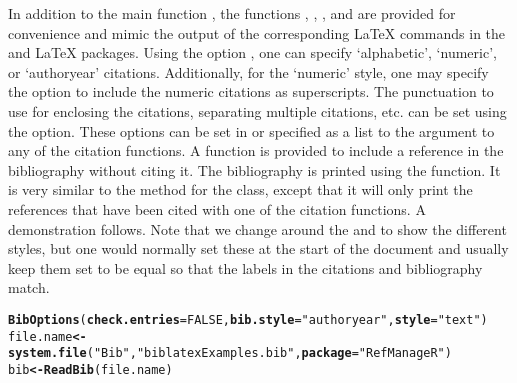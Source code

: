 \documentclass[article]{jss}\usepackage[]{graphicx}\usepackage[]{color}
\makeatletter
\newcommand{\hlnum}[1]{\textcolor[rgb]{0.125,0.125,1}{#1}}%
\newcommand{\hlstr}[1]{\textcolor[rgb]{0.125,0.125,1}{#1}}%
\newcommand{\hlstd}[1]{\textcolor[rgb]{0.251,0.251,0.282}{#1}}%
\newcommand{\hlkwb}[1]{\textcolor[rgb]{0.439,0.251,1}{\textbf{#1}}}%
\newcommand{\hlkwc}[1]{\textcolor[rgb]{0.529,0,0.184}{\textbf{#1}}}%
\newcommand{\hlkwd}[1]{\textcolor[rgb]{0.251,0.251,0.282}{\textbf{#1}}}%
\newenvironment{kframe}{%
 \def\at@end@of@kframe{}%
 \ifinner\ifhmode%
  \def\at@end@of@kframe{\end{minipage}}%
  \begin{minipage}{\columnwidth}%
 \fi\fi%
 \def\FrameCommand##1{\hskip\@totalleftmargin \hskip-\fboxsep
 \colorbox{shadecolor}{##1}\hskip-\fboxsep
     \hskip-\linewidth \hskip-\@totalleftmargin \hskip\columnwidth}%
 \MakeFramed {\advance\hsize-\width
   \@totalleftmargin\z@ \linewidth\hsize
   \@setminipage}}%
 {\par\unskip\endMakeFramed%
 \at@end@of@kframe}
\newenvironment{knitrout}{}{} %
\makeatother
\begin{document}
In addition to the main function , the functions , , , and  are provided for convenience and mimic the output of the corresponding \LaTeX{} commands in the  \citep{natbib} and  \LaTeX{} packages.  Using the option , one can specify `alphabetic', `numeric', or `authoryear'  citations.  Additionally, for the `numeric' style, one may specify the option  to include the numeric citations as superscripts.  The punctuation to use for enclosing the citations, separating multiple citations, etc. can be set using the  option.  These options can be set in  or specified as a list to the  argument to any of the citation functions.  A function  is provided to include a reference in the bibliography without citing it.  The bibliography is printed using the  function.  It is very similar to the  method for the  class, except that it will only print the references that have been cited with one of the citation functions.  A demonstration follows.  Note that we change around the  and  to show the different styles, but one would normally set these at the start of the document and usually keep them set to be equal so that the labels in the citations and bibliography match.
\begin{knitrout}
\color{fgcolor}\begin{kframe}
\begin{alltt}
\hlkwd{BibOptions}\hlstd{(}\hlkwc{check.entries} \hlstd{=} \hlnum{FALSE}\hlstd{,} \hlkwc{bib.style} \hlstd{=} \hlstr{"authoryear"}\hlstd{,} \hlkwc{style} \hlstd{=} \hlstr{"text"}\hlstd{)}
\hlstd{file.name} \hlkwb{<-} \hlkwd{system.file}\hlstd{(}\hlstr{"Bib"}\hlstd{,} \hlstr{"biblatexExamples.bib"}\hlstd{,} \hlkwc{package} \hlstd{=} \hlstr{"RefManageR"}\hlstd{)}
\hlstd{bib} \hlkwb{<-} \hlkwd{ReadBib}\hlstd{(file.name)}
\end{alltt}
\end{kframe}
\end{knitrout}
\end{document}
